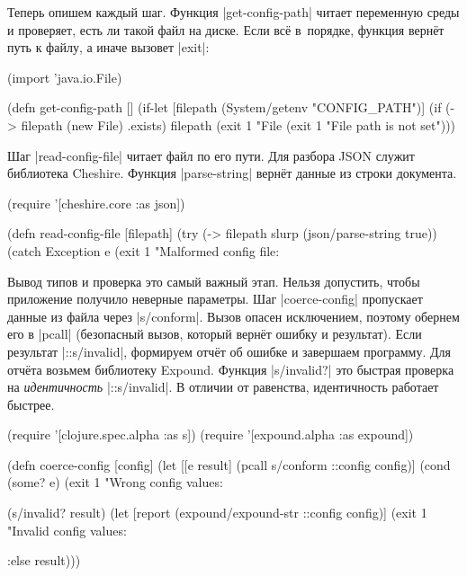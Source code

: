 Теперь опишем каждый шаг. Функция \spverb|get-config-path| читает переменную
среды и проверяет, есть ли такой файл на диске. Если вс\"{е} в~порядке, функция
верн\"{е}т путь к файлу, а иначе вызовет \spverb|exit|:


\begin{english}
  \begin{clojure}
(import 'java.io.File)

(defn get-config-path []
  (if-let [filepath (System/getenv "CONFIG_PATH")]
    (if (-> filepath (new File) .exists)
      filepath
      (exit 1 "File %
    (exit 1 "File path is not set")))
  \end{clojure}
\end{english}

Шаг \spverb|read-config-file| читает файл по его пути. Для разбора JSON служит
библиотека Cheshire. Функция \spverb|parse-string| верн\"{е}т данные из
строки документа.


\begin{english}
  \begin{clojure}
(require '[cheshire.core :as json])

(defn read-config-file
  [filepath]
  (try
    (-> filepath slurp (json/parse-string true))
    (catch Exception e
      (exit 1 "Malformed config file: %
  \end{clojure}
\end{english}


Вывод типов и проверка это самый важный этап. Нельзя допустить, чтобы приложение
получило неверные параметры. Шаг \spverb|coerce-config| пропускает данные из
файла через \spverb|s/conform|. Вызов опасен исключением, поэтому обернем его в
\spverb|pcall| (безопасный вызов, который верн\"{е}т ошибку и результат). Если
результат \spverb|::s/invalid|, формируем отч\"{е}т об ошибке и завершаем
программу. Для отч\"{е}та возьмем библиотеку Expound. Функция
\spverb|s/invalid?| это быстрая проверка на \emph{идентичность}
\spverb|::s/invalid|. В отличии от равенства, идентичность работает быстрее.

\begin{english}
  \begin{clojure}
(require '[clojure.spec.alpha :as s])
(require '[expound.alpha :as expound])

(defn coerce-config [config]
  (let [[e result] (pcall s/conform ::config config)]
    (cond
      (some? e)
      (exit 1 "Wrong config values: %

      (s/invalid? result)
      (let [report (expound/expound-str ::config config)]
        (exit 1 "Invalid config values: %

      :else result)))
  \end{clojure}
\end{english}

